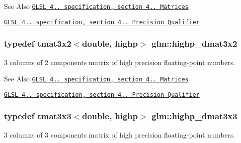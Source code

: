 \begin{DoxySeeAlso}{See Also}
\href{http://www.opengl.org/registry/doc/GLSLangSpec.4.20.8.pdf}{\tt G\-L\-S\-L 4.. specification, section 4.. Matrices} 

\href{http://www.opengl.org/registry/doc/GLSLangSpec.4.20.8.pdf}{\tt G\-L\-S\-L 4.. specification, section 4.. Precision Qualifier} 
\end{DoxySeeAlso}
\hypertarget{group__core__precision_gafe7ef85b0bc26e754cbf83fed54bf106}{
\subsubsection[{highp\-\_\-dmat3x2}]{\setlength{\rightskip}{0pt plus 5cm}typedef tmat3x2$<$double, highp$>$ {\bf glm\-::highp\-\_\-dmat3x2}}}\label{group__core__precision_gafe7ef85b0bc26e754cbf83fed54bf106}
3 columns of 2 components matrix of high precision floating-\/point numbers.

\begin{DoxySeeAlso}{See Also}
\href{http://www.opengl.org/registry/doc/GLSLangSpec.4.20.8.pdf}{\tt G\-L\-S\-L 4.. specification, section 4.. Matrices} 

\href{http://www.opengl.org/registry/doc/GLSLangSpec.4.20.8.pdf}{\tt G\-L\-S\-L 4.. specification, section 4.. Precision Qualifier} 
\end{DoxySeeAlso}
\hypertarget{group__core__precision_ga604f966e7bf042f298beb3b262287970}{
\subsubsection[{highp\-\_\-dmat3x3}]{\setlength{\rightskip}{0pt plus 5cm}typedef tmat3x3$<$double, highp$>$ {\bf glm\-::highp\-\_\-dmat3x3}}}\label{group__core__precision_ga604f966e7bf042f298beb3b262287970}
3 columns of 3 components matrix of high precision floating-\/point numbers.

